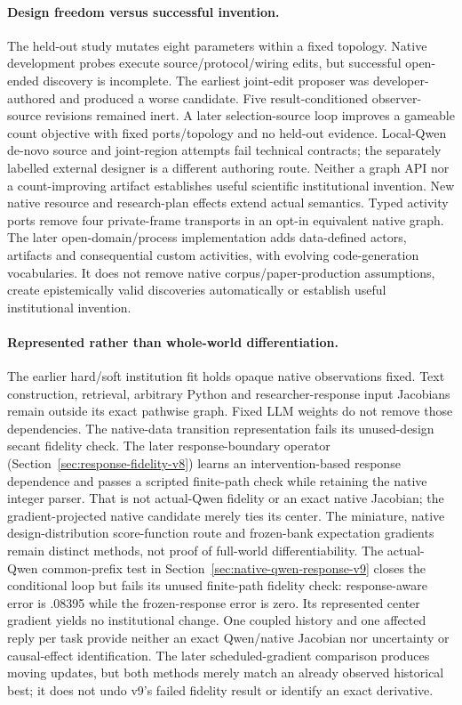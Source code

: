 \documentclass{article}
\begin{document}
\paragraph{Design freedom versus successful invention.} The held-out study
mutates eight parameters within a fixed topology. Native development probes
execute source/protocol/wiring edits, but successful open-ended discovery is
incomplete. The earliest joint-edit proposer was developer-authored and produced
a worse candidate. Five result-conditioned observer-source revisions remained
inert. A later selection-source loop improves a gameable count objective with
fixed ports/topology and no held-out evidence. Local-Qwen de-novo source and
joint-region attempts fail technical contracts; the separately labelled external
designer is a different authoring route. Neither a graph API nor a count-improving
artifact establishes useful scientific institutional invention. New native
resource and research-plan effects extend actual semantics. Typed activity
ports remove four private-frame transports in an opt-in equivalent native
graph. The later open-domain/process implementation adds data-defined actors,
artifacts and consequential custom activities, with evolving code-generation
vocabularies. It does not remove native corpus/paper-production assumptions,
create epistemically valid discoveries automatically or establish useful
institutional invention.

\paragraph{Represented rather than whole-world differentiation.} The earlier
hard/soft institution fit holds opaque native observations fixed. Text
construction, retrieval, arbitrary Python and researcher-response input
Jacobians remain outside its exact pathwise graph. Fixed LLM weights do not
remove those dependencies. The native-data transition representation fails
its unused-design secant fidelity check. The later response-boundary operator
(Section~\ref{sec:response-fidelity-v8}) learns an intervention-based response
dependence and passes a scripted finite-path check while retaining the native
integer parser. That is not actual-Qwen fidelity or an exact native Jacobian;
the gradient-projected native candidate merely ties its center. The miniature,
native design-distribution score-function route and frozen-bank expectation
gradients remain distinct methods, not proof of full-world differentiability.
The actual-Qwen common-prefix test in Section~\ref{sec:native-qwen-response-v9}
closes the conditional loop but fails its unused finite-path fidelity check:
response-aware error is .08395 while the frozen-response error is zero. Its
represented center gradient yields no institutional change. One coupled history
and one affected reply per task provide neither an exact Qwen/native Jacobian
nor uncertainty or causal-effect identification.
The later scheduled-gradient comparison produces moving updates, but both
methods merely match an already observed historical best; it does not undo
v9's failed fidelity result or identify an exact derivative.
\end{document}
